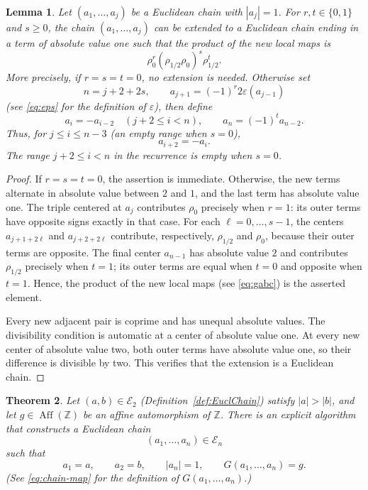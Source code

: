 \documentclass[12pt,letterpaper]{article}
\numberwithin{equation}{section}
\newcommand{\Z}{\mathbb Z}
\newcommand{\E}{\mathcal E}
\newcommand{\Aff}{\operatorname{Aff}}
\newcommand{\eps}{\varepsilon}
\theoremstyle{plain}
\newtheorem{theorem}{Theorem}[section]
\newtheorem{lemma}[theorem]{Lemma}
\theoremstyle{definition}
\begin{document}
\begin{lemma}
\label{lem:append-one}
Let $(a_1,\ldots,a_j)$ be a Euclidean chain with $|a_j|=1$. For $r,t\in\{0,1\}$ and $s\geq0$, the chain $(a_1,\ldots,a_j)$ can be extended to a Euclidean chain ending in a term of absolute value one such that the product of the new local maps is
\[
 \rho_0^r(\rho_{1/2}\rho_0)^s\rho_{1/2}^t.
\]
More precisely, if $r=s=t=0$, no extension is needed. Otherwise set
\[
 n=j+2+2s,\qquad a_{j+1}=(-1)^r2\eps(a_{j-1})
\]
(see \eqref{eq:eps} for the definition of $\eps$), then define
\[
 a_i=-a_{i-2}\quad(j+2\leq i<n),
 \qquad a_n=(-1)^t a_{n-2}.
\]
Thus, for $j\leq i\leq n-3$ (an empty range when $s=0$),
\[
 a_{i+2}=-a_i.
\]
The range $j+2\leq i<n$ in the recurrence is empty when $s=0$.
\end{lemma}

\begin{proof}
If $r=s=t=0$, the assertion is immediate. Otherwise, the new terms alternate in absolute value between $2$ and $1$, and the last term has absolute value one. The triple centered at $a_j$ contributes $\rho_0$ precisely when $r=1$: its outer terms have opposite signs exactly in that case. For each $\ell=0,\ldots,s-1$, the centers $a_{j+1+2\ell}$ and $a_{j+2+2\ell}$ contribute, respectively, $\rho_{1/2}$ and $\rho_0$, because their outer terms are opposite. The final center $a_{n-1}$ has absolute value $2$ and contributes $\rho_{1/2}$ precisely when $t=1$; its outer terms are equal when $t=0$ and opposite when $t=1$. Hence, the product of the new local maps (see \eqref{eq:gabc}) is the asserted element.

Every new adjacent pair is coprime and has unequal absolute values. The divisibility condition is automatic at a center of absolute value one. At every new center of absolute value two, both outer terms have absolute value one, so their difference is divisible by two. This verifies that the extension is a Euclidean chain.
\end{proof}

\begin{theorem}\label{thm:realization}
Let $(a,b)\in\E_2$ (Definition~\ref{def:EuclChain}) satisfy $|a|>|b|$, and let $g\in\Aff(\Z)$ be an affine automorphism of $\Z$. There is an explicit algorithm that constructs a Euclidean chain
\[
 (a_1,\ldots,a_n)\in\E_n
\]
such that
\[
 a_1=a,\qquad a_2=b,\qquad |a_n|=1,
 \qquad G(a_1,\ldots,a_n)=g.
\]
(See \eqref{eq:chain-map} for the definition of $G(a_1,\ldots,a_n)$.)
\end{theorem}
\end{document}
